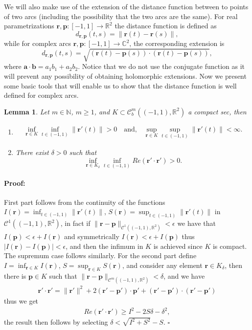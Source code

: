 \documentclass{article}
\newtheorem{lemma}[theorem]{Lemma}
\newenvironment{proof}{\paragraph{Proof:}}{\hfill$\square$}
\newcommand{\ba} {\bm a}
\newcommand{\IC}{{\mathbb C}}
\newcommand{\IN}{{\mathbb N}}
\newcommand{\IR}{{\mathbb R}}
\newcommand{\bp}{{\bm p}}
\newcommand{\cmspace}[3]{\mathcal{C}^{#1} \left( #2, #3 \right)}
\newcommand{\rgeo}[1]{\mathcal{C}_b^{#1}\left( (-1,1), \IR^2 \right)}
\newcommand{\br}{\bm{r}}
\newcommand{\bb}{\bm{b}}
\begin{document}
We will also make use of the extension of the distance function between to points of two arcs (including the possibility that the two arcs are the same).  For real parametrizations $\br, \bp :[-1,1] \rightarrow \IR^2$ the distance function is defined as 
$$d_{\br,\bp}(t,s) = \| \br(t) - \br(s)\|,$$
while for complex arcs $\br, \bp :[-1,1] \rightarrow \IC^2$, the corresponding extension is 
$$d_{\br,\bp}(t,s) =  \sqrt{(\br(t)-\bp(s))\cdot (\br(t)-\bp(s))},$$
where $\ba \cdot \bb  = a_1 b_1 + a_2 b_2$. Notice that we do not use the conjugate function as it will prevent any possibility of obtaining holomorphic extensions.  Now we present some basic tools that will enable us to show that the distance function is well defined for complex arcs. 
\begin{lemma}
\label{lemma:dwelldef}
Let $m \in \IN$, $m\geq1$, and $K \subset \rgeo{m}$ a compact sec, then 
\begin{enumerate}
\item 
\begin{align*}
\inf_{\br \in K } \inf_{t \in (-1,1)} \| \br'(t) \|>0  \quad \text{and,} \quad  \sup_{\br \in K} \sup_{t \in (-1,1)} \| \br'(t)\| < \infty.
\end{align*}
\item 
There exist $\delta >0 $ such that  
$$ 
\inf_{\br \in K_\delta} \inf_{t \in (-1,1)}Re (\br' \cdot \br') > 0 .$$
\end{enumerate}
\end{lemma}
\begin{proof}
First part follows from the continuity of the functions $I(\br) = \inf_{t \in (-1,1)} \| \br'(t)\|$, $S(\br) = \sup_{t \in (-1,1)} \| \br'(t)\|$ in $\cmspace{1}{(-1,1)}{\IR^2}$, in fact if $\| \br -\bp \|_{\cmspace{1}{(-1,1)}{\IR^2}}< \epsilon$ we have that 
$I(\bp)  < \epsilon + I(\br)$
and symmetrically 
$
I(\br)  < \epsilon + I(\bp)
$
thus $|I(\br) - I(\bp)| < \epsilon$, and then the infimum in $K$ is achieved since $K$ is compact. The supremum case follows similarly. For the second part define $I = \inf_{\br \in K } I(\br)$, $S =\sup_{\br \in K } S(\br)$, and consider any element $\br \in K_\delta$, then there is $\bp \in K$ such that $\| \br -\bp \|_{\cmspace{m}{(-1,1)}{\IR^2}} < \delta$, and we have 
\begin{align*}
\br' \cdot \br' = \|\br'\|^2+ 2(\br' -\bp')\cdot \bp' +(\br'-\bp')\cdot(\br'-\bp') 
\end{align*}
thus we get
\begin{align*}
Re(\br' \cdot \br') \geq I^2 - 2S\delta -\delta^2, \end{align*}
the result then follows by selecting $\delta < \sqrt{I^2+S^2}-S$.
\end{proof} 
\end{document}
